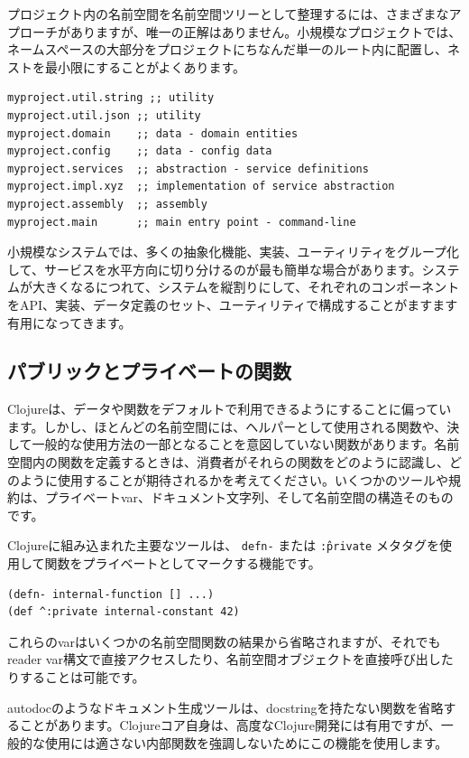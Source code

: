 プロジェクト内の名前空間を名前空間ツリーとして整理するには、さまざまなアプローチがありますが、唯一の正解はありません。小規模なプロジェクトでは、ネームスペースの大部分をプロジェクトにちなんだ単一のルート内に配置し、ネストを最小限にすることがよくあります。

\begin{lstlisting}[numbers=none]
myproject.util.string ;; utility
myproject.util.json ;; utility
myproject.domain    ;; data - domain entities
myproject.config    ;; data - config data
myproject.services  ;; abstraction - service definitions
myproject.impl.xyz  ;; implementation of service abstraction
myproject.assembly  ;; assembly
myproject.main      ;; main entry point - command-line
\end{lstlisting}

小規模なシステムでは、多くの抽象化機能、実装、ユーティリティをグループ化して、サービスを水平方向に切り分けるのが最も簡単な場合があります。システムが大きくなるにつれて、システムを縦割りにして、それぞれのコンポーネントをAPI、実装、データ定義のセット、ユーティリティで構成することがますます有用になってきます。

\subsection{パブリックとプライベートの関数}

Clojureは、データや関数をデフォルトで利用できるようにすることに偏っています。しかし、ほとんどの名前空間には、ヘルパーとして使用される関数や、決して一般的な使用方法の一部となることを意図していない関数があります。名前空間内の関数を定義するときは、消費者がそれらの関数をどのように認識し、どのように使用することが期待されるかを考えてください。いくつかのツールや規約は、プライベートvar、ドキュメント文字列、そして名前空間の構造そのものです。

Clojureに組み込まれた主要なツールは、 \texttt{defn-} または \texttt{\^:private} メタタグを使用して関数をプライベートとしてマークする機能です。


\begin{lstlisting}[numbers=none]
(defn- internal-function [] ...)
(def ^:private internal-constant 42)
\end{lstlisting}


これらのvarはいくつかの名前空間関数の結果から省略されますが、それでもreader var構文で直接アクセスしたり、名前空間オブジェクトを直接呼び出したりすることは可能です。

autodocのようなドキュメント生成ツールは、docstringを持たない関数を省略することがあります。Clojureコア自身は、高度なClojure開発には有用ですが、一般的な使用には適さない内部関数を強調しないためにこの機能を使用します。

